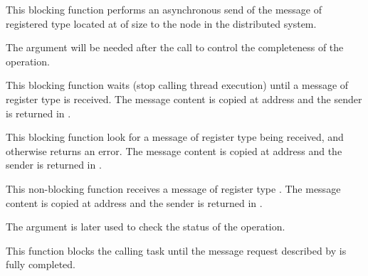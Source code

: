	 {
	   This blocking function performs an asynchronous send of the
	   message of registered type  located at
	    of size  to the node
	    in the distributed system.

	   The  argument will be needed after the call
	   to control the completeness of the operation.

	 }

	 {
	   This blocking function waits (stop calling thread execution)
	   until a message of register type  is received.
	   The message content is copied at address  and
	   the sender is returned in .
	 }

	 {
	   This blocking function look for a message of register type
	    being received, and otherwise returns an error.
	   The message content is copied at address  and
	   the sender is returned in .
	 }

	 {
	   This non-blocking function receives a message of register
	   type .
	   The message content is copied at address  and
	   the sender is returned in .

	   The argument  is later used to check the
	   status of the operation.

	 }

	 {
	   This function blocks the calling task until the message request
	   described by  is fully completed.
	 }


